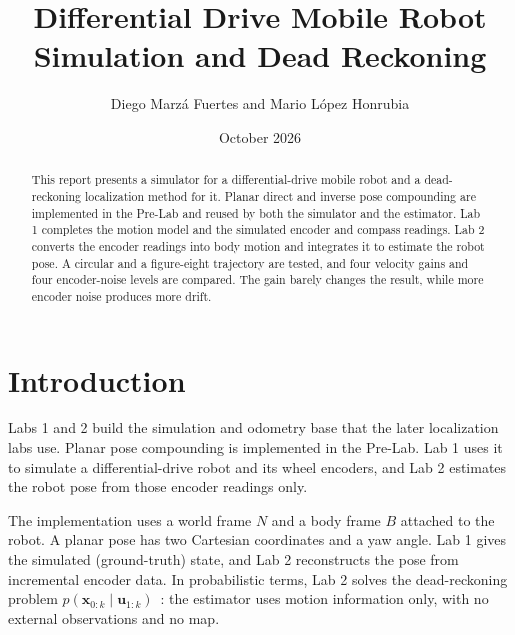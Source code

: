 \documentclass[letterpaper,12pt]{article}
\begin{document}
\title{Differential Drive Mobile Robot Simulation and Dead Reckoning}
\author{Diego Marzá Fuertes and Mario López Honrubia}
\date{October 2026}
\maketitle

\begin{abstract}
This report presents a simulator for a differential-drive mobile robot and a
dead-reckoning localization method for it. Planar direct and inverse pose
compounding are implemented in the Pre-Lab and reused by both the simulator
and the estimator. Lab 1 completes the motion model and the simulated encoder
and compass readings. Lab 2 converts the encoder readings into body motion and
integrates it to estimate the robot pose. A circular and a figure-eight
trajectory are tested, and four velocity gains and four encoder-noise levels
are compared. The gain barely changes the result, while more encoder noise
produces more drift.
\end{abstract}

\section{Introduction}

Labs 1 and 2 build the simulation and odometry base that the later
localization labs use. Planar pose compounding is implemented in the Pre-Lab.
Lab 1 uses it to simulate a differential-drive robot and its wheel encoders,
and Lab 2 estimates the robot pose from those encoder readings only.

The implementation uses a world frame $N$ and a body frame $B$ attached to
the robot. A planar
pose has two Cartesian coordinates and a yaw angle. Lab 1 gives the simulated
(ground-truth) state, and Lab 2 reconstructs the pose from incremental encoder
data. In probabilistic terms, Lab 2 solves the dead-reckoning problem
$p(\boldsymbol{x}_{0:k}\mid\boldsymbol{u}_{1:k})$~\cite[p.~19]{slidesIntro}:
the estimator uses motion information only, with no external observations
and no map.
\end{document}
